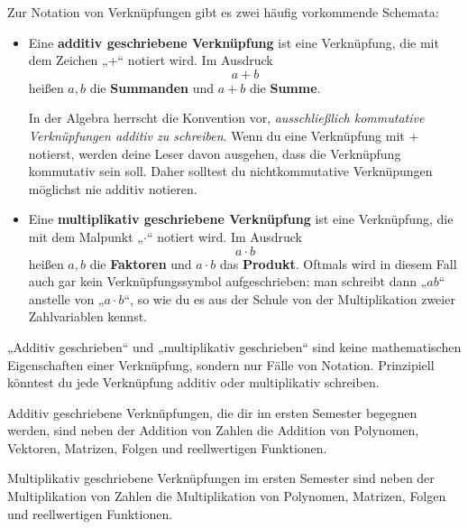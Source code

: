\begin{nota}
    Zur Notation von Verknüpfungen gibt es zwei häufig vorkommende Schemata:
    \begin{itemize}
        \item Eine \textbf{additiv geschriebene Verknüpfung} ist eine Verknüpfung, die mit dem Zeichen „$+$“ notiert wird. Im Ausdruck
            \[ a + b\]
        heißen $a,b$ die \textbf{Summanden} und $a+b$ die \textbf{Summe}.
        
        In der Algebra herrscht die Konvention vor, \emph{ausschließlich kommutative Verknüpfungen additiv zu schreiben}. Wenn du eine Verknüpfung mit $+$ notierst, werden deine Leser davon ausgehen, dass die Verknüpfung kommutativ sein soll. Daher solltest du nichtkommutative Verknüpungen möglichst nie additiv notieren.
        \item Eine \textbf{multiplikativ geschriebene Verknüpfung} ist eine Verknüpfung, die mit dem Malpunkt „$\cdot$“ notiert wird. Im Ausdruck
            \[ a\cdot b \]
        heißen $a,b$ die \textbf{Faktoren} und $a\cdot b$ das \textbf{Produkt}. Oftmals wird in diesem Fall auch gar kein Verknüpfungssymbol aufgeschrieben: man schreibt dann „$ab$“ anstelle von „$a\cdot b$“, so wie du es aus der Schule von der Multiplikation zweier Zahlvariablen kennst.
    \end{itemize}
    „Additiv geschrieben“ und „multiplikativ geschrieben“ sind keine mathematischen Eigenschaften einer Verknüpfung, sondern nur Fälle von Notation. Prinzipiell könntest du jede Verknüpfung additiv oder multiplikativ schreiben.
\end{nota}


\begin{bsp}
    Additiv geschriebene Verknüpfungen, die dir im ersten Semester begegnen werden, sind neben der Addition von Zahlen die Addition von Polynomen, Vektoren, Matrizen, Folgen und reellwertigen Funktionen.
    
    Multiplikativ geschriebene Verknüpfungen im ersten Semester sind neben der Multiplikation von Zahlen die Multiplikation von Polynomen, Matrizen, Folgen und reellwertigen Funktionen.
\end{bsp}


